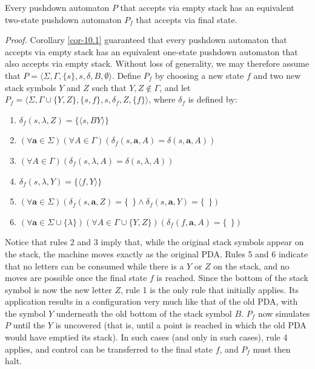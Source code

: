 \begin{thm}\label{thm-10.4}
Every pushdown automaton $P$ that accepts via empty stack has an equivalent
two-state pushdown automaton $P_{  f}$ that accepts via final state.

\emph{Proof.} Corollary \ref{cor-10.1} guaranteed that every pushdown automaton that
accepts via empty stack has an equivalent one-state pushdown automaton that also
accepts via empty stack. Without loss of generality, we may therefore assume
that $P=\langle\Sigma,\Gamma,\{s\},s,\delta,B,\emptyset\rangle$. Define $P_{  f}$ by
choosing a new state $f$ and two new stack symbols $Y$ and $Z$ such that $Y,Z
\notin \Gamma$, and let $P_{  f} = \langle\Sigma,\Gamma\cup\{Y,Z\},\{s,f\},s,
\delta_{  f},Z,\{f\}\rangle$, where $\delta_{  f}$ is defined by:
\begin{enumerate}
\item $\delta_{  f}(s,\lambda,Z) = \{\langle s,BY\rangle\}$
\item $(\forall\pmb{a}\in\Sigma)(\forall A\in\Gamma)(\delta_{  f}(s,\pmb{a},A) =
	\delta(s,\pmb{a},A))$
\item $(\forall A\in\Gamma)(\delta_{  f}(s,\lambda,A)=\delta(s,\lambda,A))$
\item $\delta_{  f}(s,\lambda,Y)=\{\langle f,Y\rangle\}$
\item $(\forall\pmb{a}\in\Sigma)(\delta_{  f}(s,\pmb{a},Z) = \{\ \ \} \wedge
	\delta_{  f}(s,\pmb{a},Y) = \{\ \ \})$
\item $(\forall\pmb{a}\in\Sigma\cup\{\lambda\})(\forall A\in\Gamma\cup\{Y,Z\})
	(\delta_{  f}(f,\pmb{a},A) = \{\ \ \})$
\end{enumerate}

Notice that rules 2 and 3 imply that, while the original stack symbols appear on
the stack, the machine moves exactly as the original PDA. Rules 5 and 6 indicate
that no letters can be consumed while there is a $Y$ or $Z$ on the stack, and no
moves are possible once the final state $f$ is reached. Since the bottom of the
stack symbol is now the new letter $Z$, rule 1 is the only rule that initially
applies. Its application results in a configuration very much like that of the
old PDA, with the symbol $Y$ underneath the old bottom of the stack symbol $B$.
$P_{  f}$ now simulates $P$ until the $Y$ is uncovered (that is, until a point is
reached in which the old PDA would have emptied its stack). In such cases (and
only in such cases), rule 4 applies, and control can be transferred to the final
state $f$, and $P_{  f}$ must then halt.


\end{thm}
